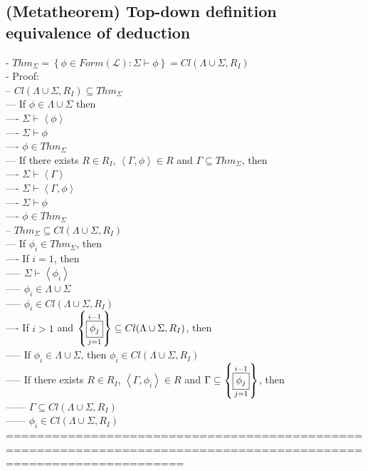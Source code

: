 \documentclass{book}
\newcommand{\set}[1]{\left\{ #1 \right\}}
\newcommand{\seq}[1]{\left\langle #1 \right\rangle}
\newcommand{\vdc}[3]{\underset{#2}{\overset{#3}{\fbox{$#1$}}}}
\begin{document}
\subsection{(Metatheorem) Top-down definition equivalence of deduction} %
	- $Thm_\Sigma = \set{\phi \in Form(\mathcal{L}): \Sigma \vdash \phi} = Cl(\Lambda \cup \Sigma, R_I)$ \\
	- Proof: \\
		-- $Cl(\Lambda \cup \Sigma, R_I) \subseteq Thm_\Sigma$ \\
			--- If $\phi \in \Lambda \cup \Sigma$ then \\
				---- $\Sigma \vdash \seq{\phi}$ \\
				---- $\Sigma \vdash \phi$ \\
				---- $\phi \in Thm_\Sigma$ \\
			--- If there exists $R \in R_I$, $\seq{\Gamma, \phi} \in R$ and $\Gamma \subseteq Thm_\Sigma$, then \\
				---- $\Sigma \vdash \seq{\Gamma}$ \\
				---- $\Sigma \vdash \seq{\Gamma, \phi}$ \\
				---- $\Sigma \vdash \phi$ \\
				---- $\phi \in Thm_\Sigma$ \\
		-- $Thm_\Sigma \subseteq Cl(\Lambda \cup \Sigma, R_I)$ \\
			--- If $\phi_i \in Thm_\Sigma$, then \\
				---- If $i = 1$, then \\
					----- $\Sigma \vdash \seq{\phi_i}$ \\
					----- $\phi_i \in \Lambda \cup \Sigma$ \\
					----- $\phi_i \in Cl(\Lambda \cup \Sigma, R_I)$ \\
				---- If $i > 1$ and $\set{\vdc{\phi_j}{j=1}{i-1}} \subseteq Cl(\Lambda \cup \Sigma, R_I)$, then \\
					----- If $\phi_i \in \Lambda \cup \Sigma$, then $\phi_i \in Cl(\Lambda \cup \Sigma, R_I)$ \\
					----- If there exists $R \in R_I$, $\seq{\Gamma, \phi_i} \in R$ and $\Gamma \subseteq \set{\vdc{\phi_j}{j=1}{i-1}}$, then \\
						------ $\Gamma \subseteq Cl(\Lambda \cup \Sigma, R_I)$ \\
						------ $\phi_i \in Cl(\Lambda \cup \Sigma, R_I)$ \\
	===================================================================================================================
\end{document}
